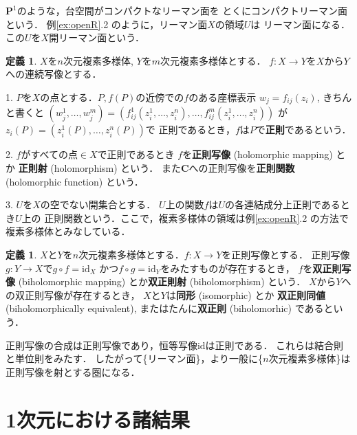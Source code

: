 \documentclass[11pt, a4paper, dvipdfmx, draft]{jsarticle}
\theoremstyle{definition}
\newtheorem{Definition}[Axiom]{定義}
\newcommand{\cc}{\mathbf{C}}
\newcommand{\pp}{\mathbf{P}}
\newcommand{\id}{\mathrm{id}}
\theoremstyle{mystyle}
\numberwithin{equation}{section} %
\begin{document}
$\pp^1$のような，台空間がコンパクトなリーマン面を
とくにコンパクトリーマン面という．
例\ref{ex:openR}.2 のように，リーマン面$X$の領域$U$は
リーマン面になる．この$U$を$X$開リーマン面という．

\begin{Definition}
    $X$を$n$次元複素多様体, $Y$を$m$次元複素多様体とする．
    $f\colon X\to Y$を$X$から$Y$への連続写像とする．
    
    1. 
    $P$を$X$の点とする．$P, f(P)$の近傍での$f$のある座標表示
    $w_j=f_{ij}(z_i)$, きちんと書くと
    $(w_{j}^{1},\dots,w_{j}^{m})
    =\left(f_{ij}^{1}(z_{i}^{1},\dots,z_{i}^{n}),\dots,f_{ij}^{m}(z_{i}^{1},\dots,z_{i}^{n})\right)$
    が$z_i(P)=(z_{i}^{1}(P),\dots,z_{i}^{n}(P))$で
    正則であるとき，$f$は$P$で\textbf{正則}であるという．
    
    2. 
    $f$がすべての点$\in X$で正則であるとき
    $f$を\textbf{正則写像} (holomorphic mapping) とか
    \textbf{正則射} (holomorphism) という．
    また$\cc$への正則写像を\textbf{正則関数} (holomorphic 
    function) という．

    3. 
    $U$を$X$の空でない開集合とする．
    $U$上の関数$f$は$U$の各連結成分上正則であるとき$U$上の
    正則関数という．ここで，複素多様体の領域は例\ref{ex:openR}.2 の方法で
    複素多様体とみなしている．
\end{Definition}

\begin{Definition}
    $X$と$Y$を$n$次元複素多様体とする．$f\colon X\to Y$を正則写像とする．
    正則写像$g\colon Y\to X$で$g\circ f=\id_X$
    かつ$f\circ g=\id_Y$をみたすものが存在するとき，
    $f$を\textbf{双正則写像} (biholomorphic mapping) とか\textbf{双正則射} (biholomorphism) という．
    $X$から$Y$への双正則写像が存在するとき，
    $X$と$Y$は\textbf{同形} (isomorphic) とか 
    \textbf{双正則同値} (biholomorphically equivalent), 
    またはたんに\textbf{双正則} (biholomorhic) であるという．
\end{Definition}

正則写像の合成は正則写像であり，恒等写像$\id$は正則である．
これらは結合則と単位則をみたす．
したがって\{リーマン面\}，より一般に\{$n$次元複素多様体\}は
正則写像を射とする圏になる．

\section{1次元における諸結果}


\end{document}
